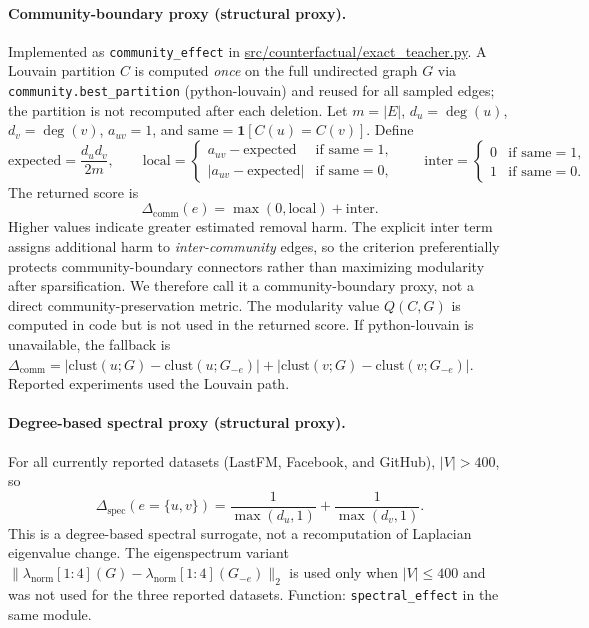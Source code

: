 \documentclass[11pt,a4paper]{article}
\providecommand{\path}[1]{\url{#1}}
\begin{document}
\paragraph{Community-boundary proxy (structural proxy).}
Implemented as \texttt{community\_effect} in
\newline
\path{src/counterfactual/exact_teacher.py}.
A Louvain partition $C$ is computed \emph{once} on the full undirected graph $G$ via \texttt{community.best\_partition} (python-louvain) and reused for all sampled edges; the partition is not recomputed after each deletion.
Let $m=|E|$, $d_u=\deg(u)$, $d_v=\deg(v)$, $a_{uv}=1$, and
$\mathrm{same}=\mathbf{1}[C(u)=C(v)]$.
Define
\[
\mathrm{expected}=\frac{d_u d_v}{2m},\qquad
\mathrm{local}=
\begin{cases}
a_{uv}-\mathrm{expected} & \text{if }\mathrm{same}=1,\\
|a_{uv}-\mathrm{expected}| & \text{if }\mathrm{same}=0,
\end{cases}
\qquad
\mathrm{inter}=
\begin{cases}
0 & \text{if }\mathrm{same}=1,\\
1 & \text{if }\mathrm{same}=0.
\end{cases}
\]
The returned score is
\[
\Delta_{\mathrm{comm}}(e)=\max(0,\mathrm{local})+\mathrm{inter}.
\]
Higher values indicate greater estimated removal harm.
The explicit $\mathrm{inter}$ term assigns additional harm to \emph{inter-community} edges, so the criterion preferentially protects community-boundary connectors rather than maximizing modularity after sparsification.
We therefore call it a community-boundary proxy, not a direct community-preservation metric.
The modularity value $Q(C,G)$ is computed in code but is not used in the returned score.
If python-louvain is unavailable, the fallback is
$\Delta_{\mathrm{comm}}=|\mathrm{clust}(u;G)-\mathrm{clust}(u;G_{-e})|+|\mathrm{clust}(v;G)-\mathrm{clust}(v;G_{-e})|$.
Reported experiments used the Louvain path.

\paragraph{Degree-based spectral proxy (structural proxy).}
For all currently reported datasets (LastFM, Facebook, and GitHub), $|V|>400$, so
\[
\Delta_{\mathrm{spec}}(e{=}\{u,v\})=\frac{1}{\max(d_u,1)}+\frac{1}{\max(d_v,1)}.
\]
This is a degree-based spectral surrogate, not a recomputation of Laplacian eigenvalue change.
The eigenspectrum variant $\|\lambda_{\mathrm{norm}}[1{:}4](G)-\lambda_{\mathrm{norm}}[1{:}4](G_{-e})\|_2$ is used only when $|V|\le 400$ and was not used for the three reported datasets.
Function: \texttt{spectral\_effect} in the same module.
\end{document}
